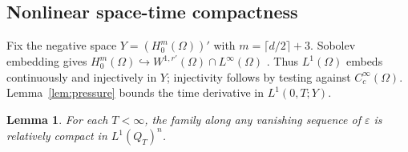 \documentclass[11pt]{article}
\newtheorem{lemma}[theorem]{Lemma}
\newcommand{\eps}{\varepsilon}
\newcommand{\Om}{\Omega}
\begin{document}
\subsection{Nonlinear space-time compactness}

Fix the negative space $Y=(H_0^m(\Om))'$ with
$m=\lceil d/2\rceil+3$. Sobolev embedding gives
$H_0^m(\Om)\hookrightarrow W^{1,r'}(\Om)\cap L^\infty(\Om)$
\cite[Corollaries 9.13 and 9.15]{Brezis}. Thus $L^1(\Om)$ embeds
continuously and injectively in $Y$; injectivity follows by testing against
$C_c^\infty(\Om)$. Lemma~\ref{lem:pressure} bounds the time derivative in
$L^1(0,T;Y)$.

\begin{lemma}\label{lem:compact}
For each $T<\infty$, the family along any vanishing sequence of $\eps$
is relatively compact in $L^1(Q_T)^n$.
\end{lemma}
\end{document}
